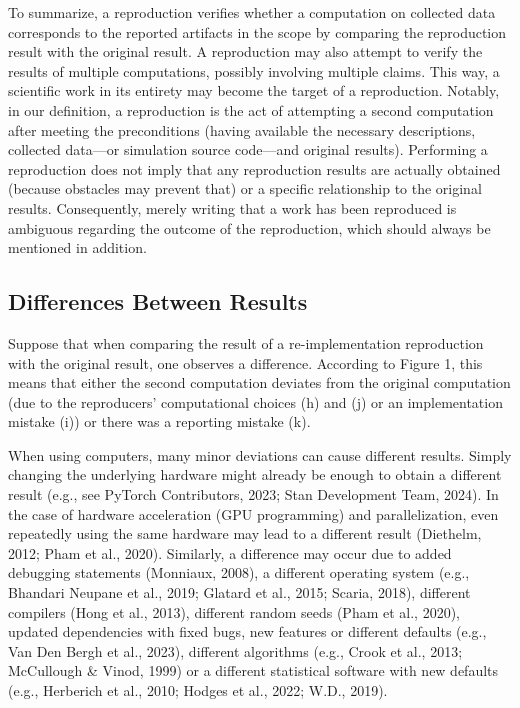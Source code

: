 \documentclass[authordate, meta]{jote-new-article}
\begin{document}
	To summarize, a reproduction verifies whether a computation on collected data corresponds to the reported artifacts in the scope by comparing the reproduction result with the original result. A reproduction may also attempt to verify the results of multiple computations, possibly involving multiple claims. This way, a scientific work in its entirety may become the target of a reproduction. Notably, in our definition, a reproduction is the act of attempting a second computation after meeting the preconditions (having available the necessary descriptions, collected data—or simulation source code—and original results). Performing a reproduction does not imply that any reproduction results are actually obtained (because obstacles may prevent that) or a specific relationship to the original results. Consequently, merely writing that a work has been reproduced is ambiguous regarding the outcome of the reproduction, which should always be mentioned in addition.



	\subsection{Differences Between Results}



	Suppose that when comparing the result of a re-implementation reproduction with the original result, one observes a difference. According to Figure 1, this means that either the second computation deviates from the original computation (due to the reproducers' computational choices (h) and (j) or an implementation mistake (i)) or there was a reporting mistake (k).



	When using computers, many minor deviations can cause different results. Simply changing the underlying hardware might already be enough to obtain a different result (e.g., see PyTorch Contributors, 2023; Stan Development Team, 2024). In the case of hardware acceleration (GPU programming) and parallelization, even repeatedly using the same hardware may lead to a different result (Diethelm, 2012; Pham et al., 2020). Similarly, a difference may occur due to added debugging statements (Monniaux, 2008), a different operating system (e.g., Bhandari Neupane et al., 2019; Glatard et al., 2015; Scaria, 2018), different compilers (Hong et al., 2013), different random seeds (Pham et al., 2020), updated dependencies with fixed bugs, new features or different defaults (e.g., Van Den Bergh et al., 2023), different algorithms (e.g., Crook et al., 2013; McCullough \& Vinod, 1999) or a different statistical software with new defaults (e.g., Herberich et al., 2010; Hodges et al., 2022; W.D., 2019).
\end{document}
